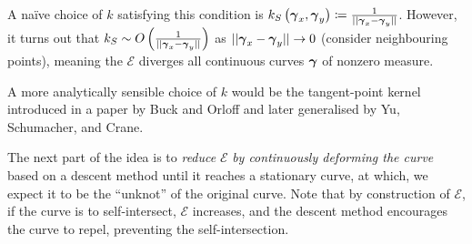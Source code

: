 \documentclass[../dissertation.tex]{subfiles}
\begin{document}
A na\"ive choice of $k$ satisfying this condition is $k_S \left( \boldsymbol{\gamma}_x, \boldsymbol{\gamma}_y \right) \coloneqq \frac{1}{\lvert \lvert \boldsymbol{\gamma}_x - \boldsymbol{\gamma}_y \rvert \rvert}$.
However, it turns out that $k_S \sim O\left( \frac{1}{\lvert \lvert \boldsymbol{\gamma}_x - \boldsymbol{\gamma}_y \rvert \rvert} \right)$ as $\lvert \lvert \boldsymbol{\gamma}_x - \boldsymbol{\gamma}_y \rvert \rvert \rightarrow 0$ (consider neighbouring points), meaning the $\mathcal{E}$ diverges all continuous curves $\boldsymbol{\gamma}$ of nonzero measure.

A more analytically sensible choice of $k$ would be the tangent-point kernel introduced in a paper by Buck and Orloff\cite{BO1995} and later generalised by Yu, Schumacher, and Crane\cite{YSC2021}.

The next part of the idea is to \emph{reduce} $\mathcal{E}$ \emph{by continuously deforming the curve} based on a descent method until it reaches a stationary curve, at which, we expect it to be the ``unknot'' of the original curve.
Note that by construction of $\mathcal{E}$, if the curve is to self-intersect, $\mathcal{E}$ increases, and the descent method encourages the curve to repel, preventing the self-intersection.
\end{document}
